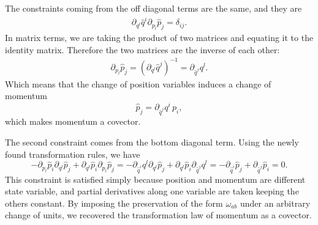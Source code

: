 The constraints coming from the off diagonal terms are the same, and they are
\begin{equation}
	\begin{aligned}
		\partial_{q^l} \hat{q}^i \partial_{p_l} \hat{p}_j = \delta_{ij}.
	\end{aligned}
\end{equation}
In matrix terms, we are taking the product of two matrices and equating it to the identity matrix. Therefore the two matrices are the inverse of each other:
\begin{equation}
	\begin{aligned}
		\partial_{p_l} \hat{p}_j = (\partial_{q^l} \hat{q}^j)^{-1} = \partial_{\hat{q}^j} q^l.
	\end{aligned}
\end{equation}
Which means that the change of position variables induces a change of momentum
\begin{equation}
	\hat{p}_j = \partial_{\hat{q}^j} q^i \, p_i,
\end{equation}
which makes momentum a covector.

The second constraint comes from the bottom diagonal term. Using the newly found transformation rules, we have
\begin{equation}
	- \partial_{p_l} \hat{p}_i \partial_{q^l} \hat{p}_j +  \partial_{q^l} \hat{p}_i \partial_{p_l} \hat{p}_j = - \partial_{\hat{q}^i} q^l \partial_{q^l} \hat{p}_j +  \partial_{q^l} \hat{p}_i \partial_{\hat{q}^j} q^l = - \partial_{\hat{q}^i} \hat{p}_j + \partial_{\hat{q}^j} \hat{p}_i = 0.
\end{equation}
This constraint is satisfied simply because position and momentum are different state variable, and partial derivatives along one variable are taken keeping the others constant. By imposing the preservation of the form $\omega_{ab}$ under an arbitrary change of units, we recovered the transformation law of momentum as a covector.

